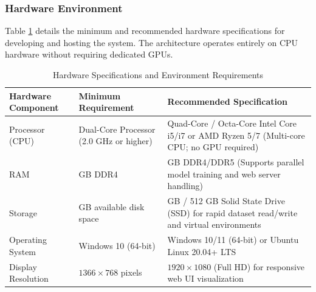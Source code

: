 \FloatBarrier

\subsubsection{Hardware Environment}
Table \ref{tab:hardware_environment} details the minimum and recommended hardware specifications for developing and hosting the system. The architecture operates entirely on CPU hardware without requiring dedicated GPUs.

\begin{table}[H]
\centering
\small
\renewcommand{\arraystretch}{1.15}
\setlength{\tabcolsep}{5pt}
\begin{tabularx}{\linewidth}{|>{\raggedright\arraybackslash}p{3.5cm}|>{\raggedright\arraybackslash}p{4.2cm}|>{\raggedright\arraybackslash}X|}
\hline
\textbf{Hardware Component} & \textbf{Minimum Requirement} & \textbf{Recommended Specification} \\
\hline
Processor (CPU) & Dual-Core Processor (2.0 GHz or higher) & Quad-Core / Octa-Core Intel Core i5/i7 or AMD Ryzen 5/7 (Multi-core CPU; no GPU required) \\
\hline
RAM & 8 GB DDR4 & 16 GB DDR4/DDR5 (Supports parallel model training and web server handling) \\
\hline
Storage & 20 GB available disk space & 256 GB / 512 GB Solid State Drive (SSD) for rapid dataset read/write and virtual environments \\
\hline
Operating System & Windows 10 (64-bit) & Windows 10/11 (64-bit) or Ubuntu Linux 20.04+ LTS \\
\hline
Display Resolution & $1366 \times 768$ pixels & $1920 \times 1080$ (Full HD) for responsive web UI visualization \\
\hline
\end{tabularx}
\caption{Hardware Specifications and Environment Requirements}
\label{tab:hardware_environment}
\end{table}
